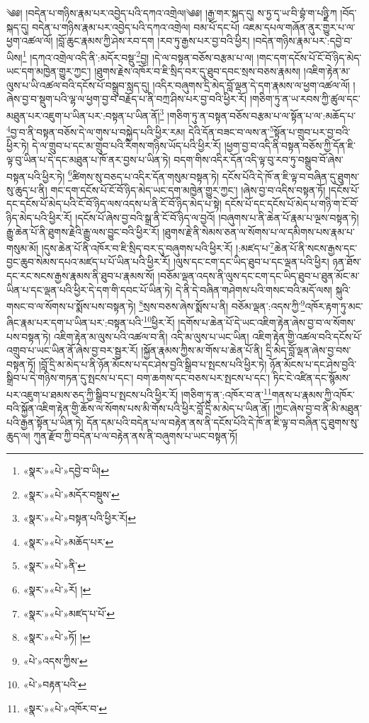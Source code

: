 ༄༅། །བདེན་པ་གཉིས་རྣམ་པར་འབྱེད་པའི་དཀའ་འགྲེལ།༄༅། །རྒྱ་གར་སྐད་དུ། ས་ཏྱ་དྭ་ཡ་བི་བྷཾ་ག་པཉྫི་ཀ །བོད་སྐད་དུ། བདེན་པ་གཉིས་རྣམ་པར་འབྱེད་པའི་དཀའ་འགྲེལ། བམ་པོ་དང་པོ། འཇམ་དཔལ་གཞོན་ནུར་གྱུར་པ་ལ་ཕྱག་འཚལ་ལོ། །བློ་ཆུང་རྣམས་ཀྱི་ཤེས་རབ་དག །རབ་ཏུ་རྒྱས་པར་བྱ་བའི་ཕྱིར། །བདེན་གཉིས་རྣམ་པར་:དབྱེ་བ་ཡིས།\footnote{«སྣར་»«པེ་»དབྱེ་བ་ཡི།} །དཀའ་འགྲེལ་འདི་ནི་:མདོར་བསྡུ་\footnote{«སྣར་»«པེ་»མདོར་བསྡུས་}བྱ། །དེ་ལ་བསྟན་བཅོས་བརྩམ་པ་ལ། །གང་དག་དངོས་པོ་ངོ་བོ་ཉིད་མེད་ཡང་དག་མཁྱེན་གྱུར་ཀྱང་། །ཐུགས་རྗེས་འཁོར་བ་ཇི་སྲིད་བར་དུ་ཐུབ་དབང་སྲས་བཅས་རྣམས། །འཇིག་རྟེན་མ་ལུས་པ་ཡི་འཚལ་བའི་དངོས་པོ་བསྒྲུབ་སླད་དུ། །འདིར་བཞུགས་དྲི་མེད་བློ་ལྡན་དེ་དག་རྣམས་ལ་ཕྱག་འཚལ་ལོ། །ཞེས་བྱ་བ་སྡུག་པའི་ལྷ་ལ་ཕྱག་བྱ་བ་བརྗོད་པ་ནི་བཀྲ་ཤིས་པར་བྱ་བའི་ཕྱིར་རོ། །གཅིག་ཏུ་ན་ཡ་རབས་ཀྱི་ཚུལ་དང་མཐུན་པར་འཇུག་པ་ཡིན་པར་:བསྟན་པ་ཡིན་ནོ།\footnote{«སྣར་»«པེ་»བསྟན་པའི་ཕྱིར་རོ།} །གཅིག་ཏུ་ན་བསྟན་བཅོས་བརྩམ་པ་ལ་སྟོན་པ་ལ་:མཆོད་པ་\footnote{«སྣར་»«པེ་»མཆོད་པར་}བྱ་བ་ནི་བསྟན་བཅོས་དེ་ལ་གུས་པ་བསྐྱེད་པའི་ཕྱིར་རམ། དེའི་དོན་བཟང་བ་ལས་ན་\footnote{«སྣར་»«པེ་»ནི་}སྟོན་པ་གྲུབ་པར་བྱ་བའི་ཕྱིར་ཏེ། དེ་ལ་གྲུབ་པ་དང་མ་གྲུབ་པའི་རིགས་གཉིས་ཡོད་པའི་ཕྱིར་རོ། །ཕྱག་བྱ་བ་འདི་ནི་བསྟན་བཅོས་ཀྱི་དོན་ཇི་ལྟ་བུ་ཡིན་པ་དེ་དང་མཐུན་པ་ཁོ་ནར་བྱས་པ་ཡིན་ཏེ། བདག་གིས་འདིར་དོན་འདི་ལྟ་བུ་རབ་ཏུ་བསྒྲུབ་བོ་ཞེས་བསྟན་པའི་ཕྱིར་ཏེ། \footnote{«སྣར་»«པེ་»རོ། ། }ཚིགས་སུ་བཅད་པ་འདིར་དོན་གསུམ་བསྟན་ཏེ། དངོས་པོའི་དེ་ཁོ་ན་ཇི་ལྟ་བ་བཞིན་དུ་ཐུགས་སུ་ཆུད་པ་ནི། གང་དག་དངོས་པོ་ངོ་བོ་ཉིད་མེད་ཡང་དག་མཁྱེན་གྱུར་ཀྱང་། །ཞེས་བྱ་བ་འདིས་བསྟན་ཏོ། །དངོས་པོ་དང་དངོས་པོ་མེད་པའི་ངོ་བོ་ཉིད་ལས་འདས་པ་ནི་ངོ་བོ་ཉིད་མེད་པ་སྟེ། དངོས་པོ་དང་དངོས་པོ་མེད་པ་གཉི་ག་ངོ་བོ་ཉིད་མེད་པའི་ཕྱིར་རོ། །དངོས་པོ་ཞེས་བྱ་བའི་སྒྲ་ནི་ངོ་བོ་ཉིད་ལ་བྱའོ། །བཞུགས་པ་ནི་ཆེན་པོ་རྣམ་པ་ལྔས་བསྟན་ཏེ། རྒྱུ་ཆེན་པོ་ནི་ཐུགས་རྗེའི་རྒྱུ་ལས་བྱུང་བའི་ཕྱིར་རོ། །ཐུགས་རྗེ་ནི་སེམས་ཅན་ལ་སོགས་པ་ལ་དམིགས་པས་རྣམ་པ་གསུམ་མོ། །དུས་ཆེན་པོ་ནི་འཁོར་བ་ཇི་སྲིད་བར་དུ་བཞུགས་པའི་ཕྱིར་རོ། །:མཛད་པ་\footnote{«སྣར་»«པེ་»མཛད་པ་པོ་}ཆེན་པོ་ནི་སངས་རྒྱས་དང་བྱང་ཆུབ་སེམས་དཔའ་མཛད་པ་པོ་ཡིན་པའི་ཕྱིར་རོ། །ལུས་དང་ངག་དང་ཡིད་ཐུབ་པ་དང་ལྡན་པའི་ཕྱིར། ཉན་ཐོས་དང་རང་སངས་རྒྱས་རྣམས་ནི་ཐུབ་པ་རྣམས་སོ། །བཅོམ་ལྡན་འདས་ནི་ལུས་དང་ངག་དང་ཡིད་ཐུབ་པ་ཐུན་མོང་མ་ཡིན་པ་དང་ལྡན་པའི་ཕྱིར་དེ་དག་གི་དབང་པོ་ཡིན་ཏེ། དེ་ནི་དེ་བཞིན་གཤེགས་པའི་གསང་བའི་མདོ་ལས། སྐུའི་གསང་བ་ལ་སོགས་པ་སྨོས་པས་བསྟན་ཏེ། \footnote{«སྣར་»«པེ་»ཏོ། ། }སྲས་བཅས་ཞེས་སྨོས་པ་ནི། བཅོམ་ལྡན་:འདས་ཀྱི་\footnote{«པེ་»འདས་ཀྱིས་}འཁོར་རྟག་ཏུ་མང་ཞིང་རྣམ་པར་དག་པ་ཡིན་པར་:བསྟན་པའི་\footnote{«པེ་»བརྟན་པའི་}ཕྱིར་རོ། །དགོས་པ་ཆེན་པོ་དེ་ཡང་འཇིག་རྟེན་ཞེས་བྱ་བ་ལ་སོགས་པས་བསྟན་ཏེ། འཇིག་རྟེན་མ་ལུས་པའི་འཚལ་བ་ནི། འདི་མ་ལུས་པ་ཡང་ཡིན། འཇིག་རྟེན་གྱི་འཚལ་བའི་དངོས་པོ་འགྲུབ་པ་ཡང་ཡིན་ནོ་ཞེས་བྱ་བར་སྦྱར་རོ། །སྐྱོན་རྣམས་ཀྱིས་མ་གོས་པ་ཆེན་པོ་ནི། དྲི་མེད་བློ་ལྡན་ཞེས་བྱ་བས་བསྟན་ཏོ། །བློ་དྲི་མ་མེད་པ་ནི་ཉོན་མོངས་པ་དང་ཤེས་བྱའི་སྒྲིབ་པ་སྤངས་པའི་ཕྱིར་ཏེ། ཉོན་མོངས་པ་དང་ཤེས་བྱའི་སྒྲིབ་པ་དེ་གཉིས་གཏན་དུ་སྤངས་པ་དང་། བག་ཆགས་དང་བཅས་པར་སྤངས་པ་དང་། ཏིང་ངེ་འཛིན་དང་སྙོམས་པར་འཇུག་པ་ཐམས་ཅད་ཀྱི་སྒྲིབ་པ་སྤངས་པའི་ཕྱིར་རོ། །གཅིག་ཏུ་ན་:འཁོར་བ་ན་\footnote{«སྣར་»«པེ་»འཁོར་བ་}གནས་པ་རྣམས་ཀྱི་འཁོར་བའི་སྐྱོན་འཇིག་རྟེན་གྱི་ཆོས་ལ་སོགས་པས་མི་གོས་པའི་ཕྱིར་བློ་དྲི་མ་མེད་པ་ཡིན་ནོ། །ཀྱང་ཞེས་བྱ་བ་ནི་མི་མཐུན་པའི་རྒྱན་སྟོན་པ་ཡིན་ཏེ། དོན་དམ་པའི་བདེན་པ་ལ་བརྟེན་ནས་ནི་དངོས་པོའི་དེ་ཁོ་ན་ཇི་ལྟ་བ་བཞིན་དུ་ཐུགས་སུ་ཆུད་ལ། ཀུན་རྫོབ་ཀྱི་བདེན་པ་ལ་བརྟེན་ནས་ནི་བཞུགས་པ་ཡང་བསྟན་ཏོ། 